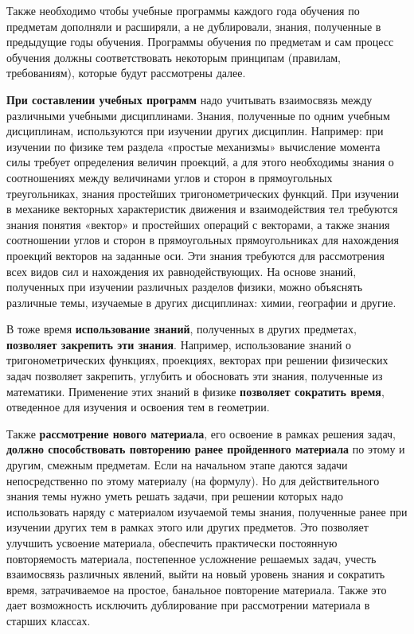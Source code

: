 Также необходимо чтобы учебные программы каждого года обучения по предметам дополняли и расширяли, а не дублировали, знания, полученные в предыдущие годы обучения. Программы обучения по предметам и сам процесс обучения должны соответствовать некоторым принципам (правилам, требованиям), которые будут рассмотрены далее.  

\textbf{При составлении учебных программ} надо учитывать взаимосвязь между различными учебными дисциплинами. Знания, полученные по одним учебным дисциплинам, используются при изучении других дисциплин. Например: при изучении по физике тем раздела «простые механизмы» вычисление момента силы требует определения величин проекций, а для этого необходимы знания о соотношениях между величинами углов и сторон в прямоугольных треугольниках, знания простейших тригонометрических функций. При изучении в механике векторных характеристик движения и взаимодействия тел требуются знания понятия «вектор» и простейших операций с векторами, а также знания соотношении углов и сторон в прямоугольных прямоугольниках для нахождения проекций векторов на заданные оси. Эти знания требуются для рассмотрения всех видов сил и нахождения их равнодействующих. На основе знаний, полученных при изучении различных разделов физики, можно объяснять различные темы, изучаемые в других дисциплинах: химии, географии и другие.

В тоже время \textbf{использование знаний}, полученных в других предметах, \textbf{позволяет закрепить эти знания}. Например, использование знаний о тригонометрических функциях, проекциях, векторах при решении физических задач позволяет закрепить, углубить и обосновать эти знания, полученные из математики. Применение этих знаний в физике \textbf{позволяет сократить время}, отведенное для изучения и освоения тем в геометрии. 

Также \textbf{рассмотрение нового материала}, его освоение в рамках решения задач, \textbf{должно способствовать повторению ранее пройденного материала} по этому и другим, смежным предметам. Если на начальном этапе даются задачи непосредственно по этому материалу (на формулу). Но для действительного знания темы нужно уметь решать задачи, при решении которых надо использовать наряду с материалом изучаемой темы знания, полученные ранее при изучении других тем в рамках этого или других предметов. Это позволяет улучшить усвоение материала, обеспечить практически постоянную повторяемость материала, постепенное усложнение решаемых задач, учесть взаимосвязь различных явлений, выйти на новый уровень знания и сократить время, затрачиваемое на простое, банальное повторение материала. Также это дает возможность исключить дублирование при рассмотрении материала в старших классах. 

